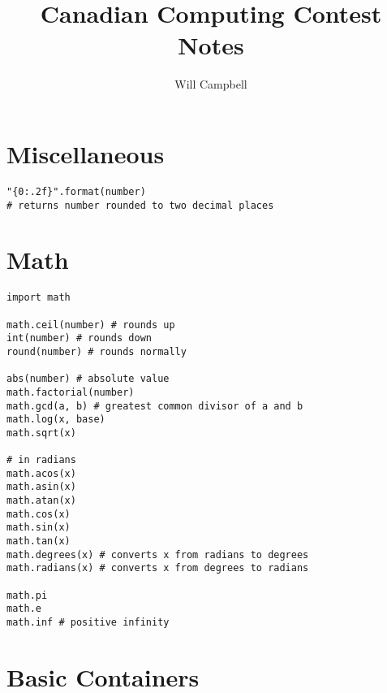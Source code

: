 \documentclass[12pt]{article}
\title{Canadian Computing Contest Notes}
\author{Will Campbell}
\begin{document}
\section{Miscellaneous}
\begin{lstlisting}
"{0:.2f}".format(number)
# returns number rounded to two decimal places
\end{lstlisting}

\section{Math}
\begin{lstlisting}
import math

math.ceil(number) # rounds up
int(number) # rounds down
round(number) # rounds normally

abs(number) # absolute value
math.factorial(number)
math.gcd(a, b) # greatest common divisor of a and b
math.log(x, base)
math.sqrt(x)

# in radians
math.acos(x)
math.asin(x)
math.atan(x)
math.cos(x)
math.sin(x)
math.tan(x)
math.degrees(x) # converts x from radians to degrees
math.radians(x) # converts x from degrees to radians

math.pi
math.e
math.inf # positive infinity
\end{lstlisting}

\section{Basic Containers}
\end{document}

